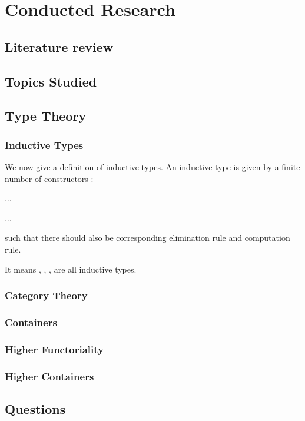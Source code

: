 \chapter{Conducted Research}

\section{Literature review}

\section{Topics Studied}

\section{Type Theory}

\subsection{Inductive Types}

We now give a definition of inductive types. An inductive type  is given by a finite number of constructors :

\AgdaSpace{}%
\AgdaSpace{}%
\AgdaSymbol{:}\AgdaSpace{}%
\AgdaSpace{}%
%

%
%
\AgdaSymbol{:}\AgdaSpace{}%
\AgdaSpace{}%
\AgdaSpace{}%
\AgdaSpace{}%
\AgdaSpace{}%
...
\AgdaSpace{}%
%

%
%
\AgdaSymbol{:}\AgdaSpace{}%
\AgdaSpace{}%
\AgdaSpace{}%
\AgdaSpace{}%
\AgdaSpace{}%
...
\AgdaSpace{}%
%

such that there should also be corresponding elimination rule and computation rule.

It means , , ,  are all inductive types.

\subsection{Category Theory}

\subsection{Containers}

\subsection{Higher Functoriality}

\subsection{Higher Containers}

\section{Questions}
